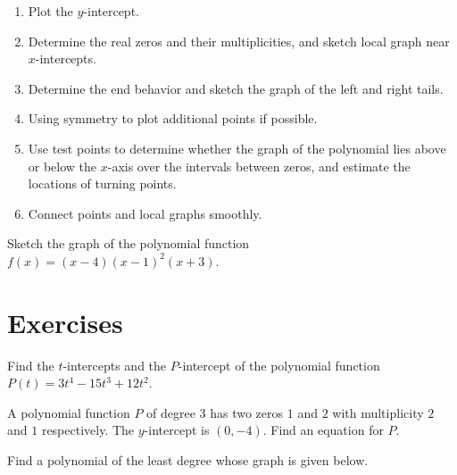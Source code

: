 \begin{howto}
\begin{enumerate}
  \item Plot the $y$-intercept.
  \item Determine the real zeros and their multiplicities, and sketch local graph near $x$-intercepts.
  \item Determine the end behavior and sketch the graph of the left and right tails.
  \item Using symmetry to plot additional points if possible.
  \item Use test points to determine whether the graph of the polynomial lies above or below the $x$-axis over the intervals between zeros, and estimate the locations of turning points.
  \item Connect points and local graphs smoothly.
\end{enumerate}
\end{howto}

\newpage

\begin{example}
  Sketch the graph of the polynomial function $f(x)=(x-4)(x-1)^2 (x+3)$.  
\end{example}
\newpage

\section*{Exercises}

\begin{exercise}
  Find the $t$-intercepts and the $P$-intercept of the polynomial function $P(t)=3t^4-15t^3+12t^2$.
\end{exercise}

\begin{exercise}
    A polynomial function $P$ of degree 3 has two zeros $1$ and $2$ with multiplicity $2$ and $1$ respectively. The $y$-intercept is $(0, -4)$. Find an equation for $P$.
\end{exercise}

\newpage

\begin{exercise}
  Find a polynomial of the least degree whose graph is given below.\\
\end{exercise}
\vspace*{-0.2\textheight}

